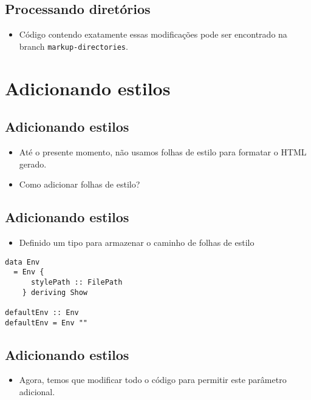 \documentclass[11pt]{article}
\begin{document}
\subsection*{Processando diretórios}
\label{sec:orge1a0d90}

\begin{itemize}
\item Código contendo exatamente essas modificações pode ser encontrado na branch \texttt{markup-directories}.
\end{itemize}
\section*{Adicionando estilos}
\label{sec:org2394107}

\subsection*{Adicionando estilos}
\label{sec:org76588a5}

\begin{itemize}
\item Até o presente momento, não usamos folhas de estilo para formatar o HTML gerado.

\item Como adicionar folhas de estilo?
\end{itemize}
\subsection*{Adicionando estilos}
\label{sec:org470878c}

\begin{itemize}
\item Definido um tipo para armazenar o caminho de folhas de estilo
\end{itemize}

\begin{verbatim}
data Env
  = Env {
      stylePath :: FilePath
    } deriving Show

defaultEnv :: Env
defaultEnv = Env ""
\end{verbatim}
\subsection*{Adicionando estilos}
\label{sec:orgfe3e968}

\begin{itemize}
\item Agora, temos que modificar todo o código para permitir este parâmetro adicional.
\end{itemize}
\end{document}
